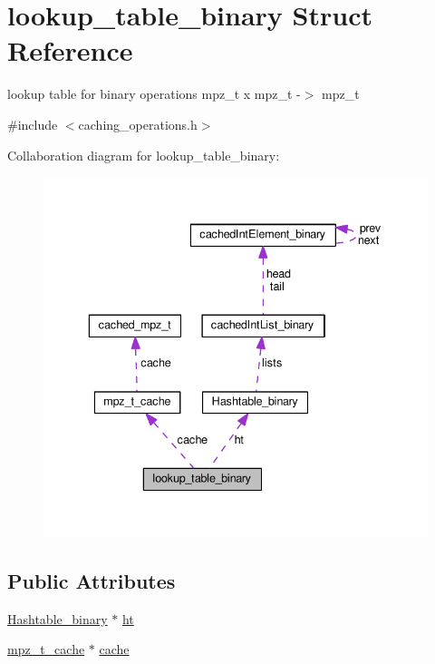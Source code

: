 \hypertarget{structlookup__table__binary}{}\section{lookup\+\_\+table\+\_\+binary Struct Reference}
\label{structlookup__table__binary}


lookup table for binary operations mpz\+\_\+t x mpz\+\_\+t -\/$>$ mpz\+\_\+t  




{\ttfamily \#include $<$caching\+\_\+operations.\+h$>$}



Collaboration diagram for lookup\+\_\+table\+\_\+binary\+:\nopagebreak
\begin{figure}[H]
\begin{center}
\leavevmode
\includegraphics[width=336pt]{structlookup__table__binary__coll__graph}
\end{center}
\end{figure}
\subsection*{Public Attributes}
\begin{DoxyCompactItemize}
\item 
\hyperlink{structHashtable__binary}{Hashtable\+\_\+binary} $\ast$ \hyperlink{structlookup__table__binary_ae12894f1b36d77b08582558701d25029}{ht}
\item 
\hyperlink{structmpz__t__cache}{mpz\+\_\+t\+\_\+cache} $\ast$ \hyperlink{structlookup__table__binary_ad68f0a417fc2f1e237bfc5077d5f68c6}{cache}
\end{DoxyCompactItemize}


